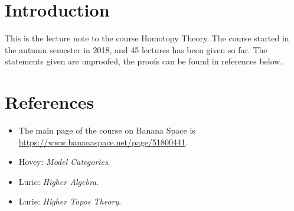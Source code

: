 \section*{Introduction}

This is the lecture note to the course Homotopy Theory. 
The course started in the autumn semester in 2018, and 45 lectures has been given so far.
The statements given are unproofed, the proofs can be found in references below.

\section*{References}

\begin{itemize}
\item The main page of the course on Banana Space is \url{https://www.bananaspace.net/page/51800441}.    
\item Hovey: \textit{Model Categories}.
\item Lurie: \textit{Higher Algebra}.
\item Lurie: \textit{Higher Topos Theory}.
\end{itemize}
